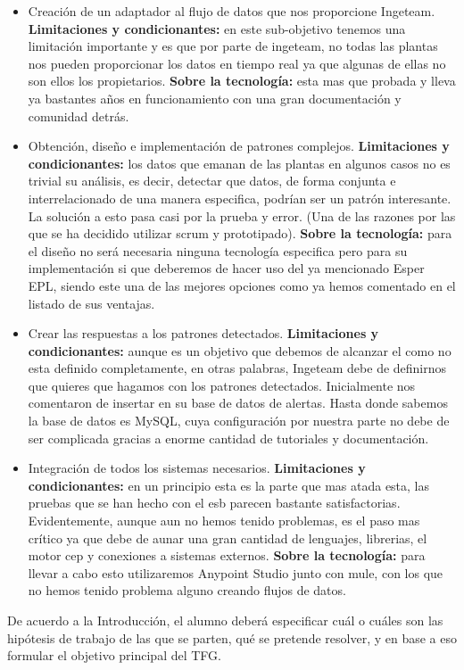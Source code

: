\documentclass[a4paper]{article}
\begin{document}
\begin{itemize}
	\item Creación de un adaptador al flujo de datos que nos proporcione Ingeteam. \newline
    \textbf{Limitaciones y condicionantes:} en este sub-objetivo tenemos una limitación importante y es que por parte de ingeteam, no todas las plantas nos pueden proporcionar los datos en tiempo real ya que algunas de ellas no son ellos los propietarios.\newline 
    \textbf{Sobre la tecnología:} esta mas que probada y lleva ya bastantes años en funcionamiento con una gran documentación y comunidad detrás.
    
    \item Obtención, diseño e implementación de patrones complejos.
    \textbf{Limitaciones y condicionantes:} los datos que emanan de las plantas en algunos casos no es trivial su análisis, es decir, detectar que datos, de forma conjunta e interrelacionado de una manera especifica, podrían ser un patrón interesante. La solución a esto pasa casi por la prueba y error. (Una de las razones por las que se ha decidido utilizar scrum y prototipado).
    \textbf{Sobre la tecnología:} para el diseño no será necesaria ninguna tecnología especifica pero para su implementación si que deberemos de hacer uso del ya mencionado Esper EPL, siendo este una de las mejores opciones como ya hemos comentado en el listado de sus ventajas.
    
    \item Crear las respuestas a los patrones detectados.
    \textbf{Limitaciones y condicionantes:} aunque es un objetivo que debemos de alcanzar el como no esta definido completamente, en otras palabras, Ingeteam debe de definirnos que quieres que hagamos con los patrones detectados. Inicialmente nos comentaron de insertar en su base de datos de alertas. Hasta donde sabemos la base de datos es MySQL, cuya configuración por nuestra parte no debe de ser complicada gracias a enorme cantidad de tutoriales y documentación.
    
    \item Integración de todos los sistemas necesarios.
    \textbf{Limitaciones y condicionantes:} en un principio esta es la parte que mas atada esta, las pruebas que se han hecho con el esb parecen bastante satisfactorias. Evidentemente, aunque aun no hemos tenido problemas, es el paso mas crítico ya que debe de aunar una gran cantidad de lenguajes, librerias, el motor cep y conexiones a sistemas externos.
    \textbf{Sobre la tecnología:} para llevar a cabo esto utilizaremos Anypoint Studio junto con mule, con los que no hemos tenido problema alguno creando flujos de datos.

\end{itemize}
De acuerdo a la Introducci\'on, el alumno deber\'a especificar cu\'al o cuáles son las hip\'otesis de trabajo de las
que se parten, qu\'e se pretende resolver, y en base a eso formular el objetivo principal del TFG.
\end{document}
